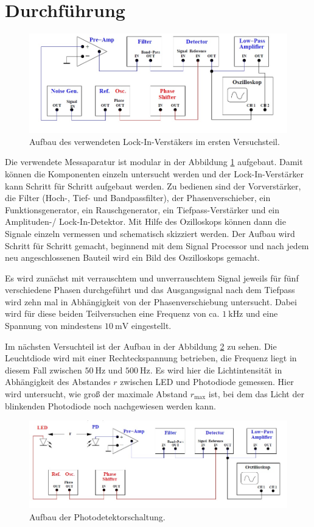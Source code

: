 \section{Durchführung}
\label{sec:Durchführung}
\begin{figure}[h!]
	\centering
	\includegraphics[width=0.8\linewidth]{aufbau1.jpg}
	\caption{Aufbau des verwendeten Lock-In-Verstäkers im ersten Versuchsteil. \cite[3]{anleitung303} }
	\label{fig:aufbau1}
\end{figure}

Die verwendete Messaparatur ist modular in der Abbildung \ref{fig:aufbau1} aufgebaut. Damit können die Komponenten einzeln untersucht werden und der Lock-In-Verstärker kann Schritt für Schritt aufgebaut werden. 
Zu bedienen sind der Vorverstärker, die Filter (Hoch-, Tief- und Bandpassfilter), der Phasenverschieber, ein Funktionsgenerator, ein Rauschgenerator, ein Tiefpass-Verstärker und ein Amplituden-/ Lock-In-Detektor. 
Mit Hilfe des Ozilloskops können dann die Signale einzeln vermessen und schematisch skizziert werden. Der Aufbau wird Schritt für Schritt gemacht, beginnend mit dem Signal Processor und nach jedem neu angeschlossenen 
Bauteil wird ein Bild des Oszilloskops gemacht. 

Es wird zunächst mit verrauschtem und unverrauschtem Signal jeweils für fünf verschiedene Phasen durchgeführt und das Ausgangssignal nach dem Tiefpass wird zehn mal in Abhängigkeit von der Phasenverschiebung untersucht. 
Dabei wird für diese beiden Teilversuchen eine Frequenz von ca. $\SI{1}{\kilo\hertz}$ und eine Spannung von mindestens $\SI{10}{\milli\volt}$ eingestellt.

Im nächsten Versuchteil ist der Aufbau in der Abbildung \ref{fig:ledaufbau} zu sehen. Die Leuchtdiode wird mit einer Rechteckspannung betrieben, die Frequenz liegt in diesem Fall 
zwischen $\SI{50}{\hertz}$ und $\SI{500}{\hertz}$.
Es wird hier die Lichtintensität in Abhängigkeit des Abstandes $r$ zwischen LED und Photodiode gemessen. Hier wird untersucht, wie groß der maximale Abstand $r_\text{max}$ ist, bei dem das Licht der blinkenden 
Photodiode noch nachgewiesen werden kann. 
\begin{figure}[h!]
	\centering
	\includegraphics[width=0.8\linewidth]{LEDAufbau.jpg}
	\caption{Aufbau der Photodetektorschaltung. \cite[4]{anleitung303}}
	\label{fig:ledaufbau}
\end{figure}
